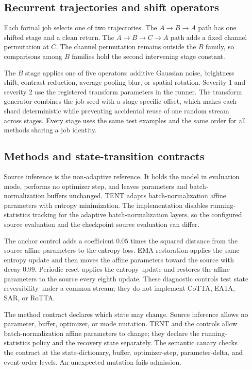 \documentclass[11pt]{article}
\newcommand{\A}{\ensuremath{A}}
\newcommand{\B}{\ensuremath{B}}
\newcommand{\C}{\ensuremath{C}}
\begin{document}
\subsection{Recurrent trajectories and shift operators}
\label{sec:shifts}

Each formal job selects one of two trajectories. The $\A\to\B\to\A$ path has one shifted stage and a clean return. The $\A\to\B\to\C\to\A$ path adds a fixed channel permutation at $\C$. The channel permutation remains outside the $\B$ family, so comparisons among $\B$ families hold the second intervening stage constant.

The $\B$ stage applies one of five operators: additive Gaussian noise, brightness shift, contrast reduction, average-pooling blur, or spatial rotation. Severity 1 and severity 2 use the registered transform parameters in the runner. The transform generator combines the job seed with a stage-specific offset, which makes each shard deterministic while preventing accidental reuse of one random stream across stages. Every stage uses the same test examples and the same order for all methods sharing a job identity.

\subsection{Methods and state-transition contracts}
\label{sec:methods-contract}

Source inference is the non-adaptive reference. It holds the model in evaluation mode, performs no optimizer step, and leaves parameters and batch-normalization buffers unchanged. TENT adapts batch-normalization affine parameters with entropy minimization. The implementation disables running-statistics tracking for the adaptive batch-normalization layers, so the configured source evaluation and the checkpoint source evaluation can differ.

The anchor control adds a coefficient $0.05$ times the squared distance from the source affine parameters to the entropy loss. EMA restoration applies the same entropy update and then moves the affine parameters toward the source with decay $0.99$. Periodic reset applies the entropy update and restores the affine parameters to the source every eighth update. These diagnostic controls test state reversibility under a common stream; they do not implement CoTTA, EATA, SAR, or RoTTA.

The method contract declares which state may change. Source inference allows no parameter, buffer, optimizer, or mode mutation. TENT and the controls allow batch-normalization affine parameters to change; they declare the running-statistics policy and the recovery state separately. The semantic canary checks the contract at the state-dictionary, buffer, optimizer-step, parameter-delta, and event-order levels. An unexpected mutation fails admission.
\end{document}
